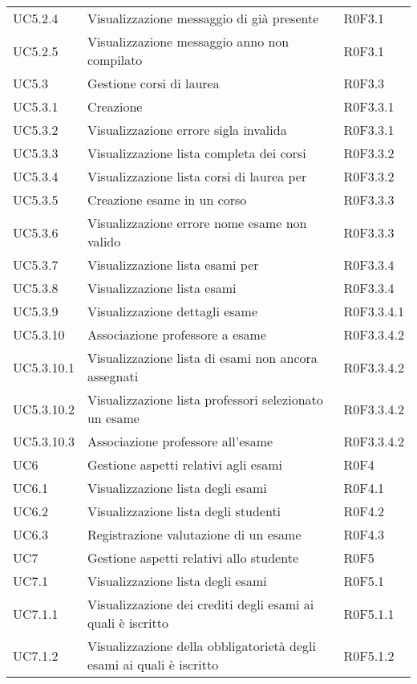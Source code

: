 \documentclass[AnalisiDeiRequisiti.tex]{subfiles}
\begin{document}
\begin{longtable}[H]{p{2cm}p{5cm}p{5cm}}
	UC5.2.4 & Visualizzazione messaggio di \citGloss{anno accademico} già presente & R0F3.1 \\  
	UC5.2.5 & Visualizzazione messaggio anno non compilato &  R0F3.1 \\  
	UC5.3 & Gestione corsi di laurea &  R0F3.3 \\   
	UC5.3.1 & Creazione \citGloss{corso di laurea} &  R0F3.3.1 \\  
	UC5.3.2 & Visualizzazione errore sigla invalida & R0F3.3.1 \\  
	UC5.3.3 & Visualizzazione lista completa dei corsi &  R0F3.3.2 \\  
	UC5.3.4 & Visualizzazione lista corsi di laurea per \citGloss{anno accademico} & R0F3.3.2  \\  
	UC5.3.5 & Creazione esame in un corso &  R0F3.3.3\\  
	UC5.3.6 & Visualizzazione errore nome esame non valido & R0F3.3.3  \\  
	UC5.3.7 & Visualizzazione lista esami per \citGloss{corso di laurea} & R0F3.3.4 \\  
	UC5.3.8 & Visualizzazione lista esami &  R0F3.3.4 \\  
	UC5.3.9 & Visualizzazione dettagli esame & R0F3.3.4.1 \\  
	UC5.3.10 & Associazione professore a esame & R0F3.3.4.2 \\
	UC5.3.10.1 & Visualizzazione lista di esami non ancora assegnati & R0F3.3.4.2 \\ 
	UC5.3.10.2 & Visualizzazione lista professori selezionato un esame & R0F3.3.4.2 \\ 
	UC5.3.10.3 & Associazione professore all'esame & R0F3.3.4.2 \\ 
	UC6 & Gestione aspetti relativi agli esami & R0F4 \\  
	UC6.1 & Visualizzazione lista degli esami & R0F4.1 \\  
	UC6.2 & Visualizzazione lista degli studenti & R0F4.2  \\  
	UC6.3 & Registrazione valutazione di un esame & R0F4.3 \\  
	UC7 & Gestione aspetti relativi allo studente & R0F5 \\  
	UC7.1 & Visualizzazione lista degli esami & R0F5.1 \\  
	UC7.1.1 & Visualizzazione dei crediti degli esami ai quali è iscritto & R0F5.1.1 \\  
	UC7.1.2 & Visualizzazione della obbligatorietà degli esami ai quali è iscritto & R0F5.1.2 \\  

\end{longtable}
\end{document}

